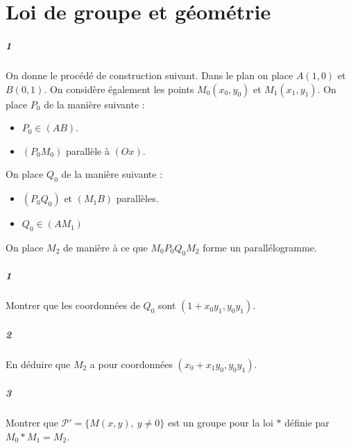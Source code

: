 \documentclass[10pt,a4paper]{article}
\begin{document}
\section{Loi de groupe et géométrie}
\subparagraph{1}
On donne le procédé de construction suivant. Dans le plan on place $A(1,0)$ et $B(0,1)$. On considère également les points $M_0(x_0,y_0)$ et $M_1(x_1,y_1)$. On place $P_0$ de la manière suivante :
\begin{itemize}
\item $P_0 \in (AB)$.
\item $(P_0 M_0)$ parallèle à $(Ox)$. 
\end{itemize}
On place $Q_0$ de la manière suivante :
\begin{itemize}
\item $(P_0 Q_0)$ et $(M_1B)$ parallèles.
\item $Q_0 \in (AM_1)$
\end{itemize}
On place $M_2$ de manière à ce que $M_0P_0Q_0M_2$ forme un parallélogramme.
\subparagraph{1}Montrer que les coordonnées de $Q_0$ sont $(1+x_0y_1,y_0y_1)$.
\subparagraph{2}En déduire que $M_2$ a pour coordonnées $(x_0+x_1y_0,y_0y_1)$.
\subparagraph{3}Montrer que $\mathcal{P}'=\lbrace M(x,y), \ y \neq 0 \rbrace$ est un groupe pour la loi $*$ définie par $M_0*M_1=M_2$.
\end{document}
